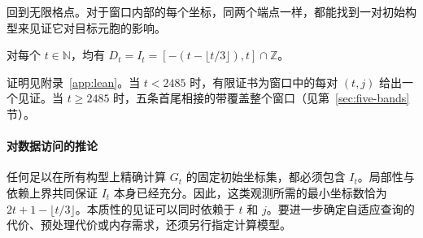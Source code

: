 回到无限格点。对于窗口内部的每个坐标，同两个端点一样，都能找到一对初始构型来见证它对目标元胞的影响。

\begin{theorem}[区间内每个坐标都是本质坐标]\label{thm:gap-free}
对每个 $t \in \mathbb{N}$，均有 $D_t = I_t = [-(t - \lfloor t/3 \rfloor), t] \cap \mathbb{Z}$。
\end{theorem}

证明见附录~\ref{app:lean}。当 $t<2485$ 时，有限证书为窗口中的每对 $(t,j)$ 给出一个见证。当 $t\ge2485$ 时，五条首尾相接的带覆盖整个窗口（见第~\ref{sec:five-bands} 节）。

\paragraph{对数据访问的推论}
任何足以在所有构型上精确计算 $G_t$ 的固定初始坐标集，都必须包含 $I_t$。局部性与依赖上界共同保证 $I_t$ 本身已经充分。因此，这类观测所需的最小坐标数恰为 $2t+1-\lfloor t/3\rfloor$。本质性的见证可以同时依赖于 $t$ 和 $j$。要进一步确定自适应查询的代价、预处理代价或内存需求，还须另行指定计算模型。
